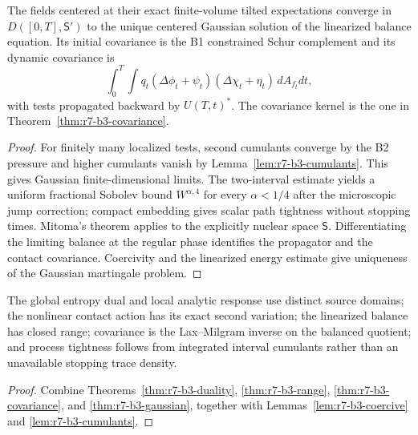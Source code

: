 \begin{theorem}
\label{thm:r7-b3-gaussian}
The fields centered at their exact finite-volume tilted expectations converge
in $D([0,T],\mathsf S')$ to the unique centered Gaussian solution of the
linearized balance equation.  Its initial covariance is the B1 constrained
Schur complement and its dynamic covariance is
\[
 \int_0^T\int q_t
  (\Delta\phi_t+\psi_t)(\Delta\chi_t+\eta_t)
  \,dA_{f_t}dt,
\]
with tests propagated backward by $U(T,t)^*$.  The covariance kernel is the one
in Theorem~\ref{thm:r7-b3-covariance}.
\end{theorem}

\begin{proof}
For finitely many localized tests, second cumulants converge by the B2 pressure
and higher cumulants vanish by
Lemma~\ref{lem:r7-b3-cumulants}.  This gives Gaussian finite-dimensional
limits.  The two-interval estimate yields a uniform fractional Sobolev bound
$W^{\alpha,4}$ for every $\alpha<1/4$ after the microscopic jump correction;
compact embedding gives scalar path tightness without stopping times.  Mitoma's
theorem applies to the explicitly nuclear space $\mathsf S$.  Differentiating
the limiting balance at the regular phase identifies the propagator and the
contact covariance.  Coercivity and the linearized energy estimate give
uniqueness of the Gaussian martingale problem.
\end{proof}

\begin{theorem}
\label{thm:r7-b3-main}
The global entropy dual and local analytic response use distinct source
domains; the nonlinear contact action has its exact second variation; the
linearized balance has closed range; covariance is the Lax--Milgram inverse on
the balanced quotient; and process tightness follows from integrated interval
cumulants rather than an unavailable stopping trace density.
\end{theorem}

\begin{proof}
Combine Theorems~\ref{thm:r7-b3-duality},
\ref{thm:r7-b3-range},
\ref{thm:r7-b3-covariance}, and
\ref{thm:r7-b3-gaussian}, together with
Lemmas~\ref{lem:r7-b3-coercive} and
\ref{lem:r7-b3-cumulants}.
\end{proof}
